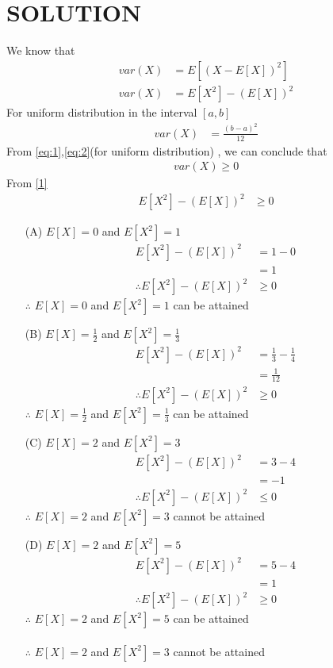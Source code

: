 \documentclass[journal,12pt,twocolumn]{IEEEtran}
\begin{document}
\section*{SOLUTION}
We know that
\begin{align}
var(X)&=E[(X-E[X])^2] \label{eq:1} \\
var(X)&=E[X^2]-(E[X])^2 \label{1}
\end{align}
For uniform distribution in the interval $[a,b]$
\begin{align}
var(X) &= \frac{{(b-a)}^2}{12} \label{eq:2}
\end{align}
From \eqref{eq:1},\eqref{eq:2}(for uniform distribution) , we can conclude that 
\begin{align}
var(X) \geq 0 \label{2}
\end{align}
From \eqref{1}
\begin{align}
E[X^2]-(E[X])^2 & \geq 0
\end{align}
\begin{enumerate}
\item[(A)] $E[X]=0$ and $E[X^2]=1$
\begin{align}
E[X^2]-(E[X])^2 &=1 - 0\\
&=1\\
\therefore E[X^2]-(E[X])^2 &\geq 0
\end{align}
$\therefore$ $E[X]=0$ and $E[X^2]=1$ can be attained \\
\item[(B)] $E[X]=\frac{1}{2}$ and $E[X^2]=\frac{1}{3}$
\begin{align}
E[X^2]-(E[X])^2 &=\frac{1}{3} - \frac{1}{4}\\
&=\frac{1}{12}\\
\therefore E[X^2]-(E[X])^2 &\geq 0
\end{align}
$\therefore$ $E[X]=\frac{1}{2}$ and $E[X^2]=\frac{1}{3}$ can be attained \\
\item[(C)] $E[X]=2$ and $E[X^2]=3$
\begin{align}
E[X^2]-(E[X])^2 &=3 - 4\\
&=-1\\
\therefore E[X^2]-(E[X])^2 &\leq 0
\end{align}
$\therefore$ $E[X]=2$ and $E[X^2]=3$ cannot be attained \\
\item[(D)] $E[X]=2$ and $E[X^2]=5$
\begin{align}
E[X^2]-(E[X])^2 &=5 - 4\\
&=1\\
\therefore E[X^2]-(E[X])^2 &\geq 0
\end{align}
$\therefore$ $E[X]=2$ and $E[X^2]=5$ can be attained\\ \\
$\therefore$ $E[X]=2$ and $E[X^2]=3$ cannot be attained\\
\end{enumerate}
\end{document}
